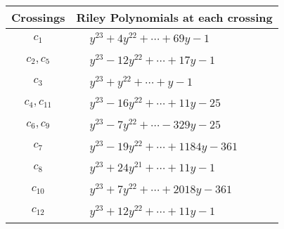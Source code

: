 \documentclass[1p]{elsarticle_modified}
\theoremstyle{definition}
\begin{document}
\begin{tabular}{m{50pt}|m{274pt}}
Crossings & \hspace{64pt}Riley Polynomials at each crossing \\
\hline $$\begin{aligned}c_{1}\end{aligned}$$&$\begin{aligned}
&y^{23}+4 y^{22}+\cdots+69 y-1
\end{aligned}$\\
\hline $$\begin{aligned}c_{2},c_{5}\end{aligned}$$&$\begin{aligned}
&y^{23}-12 y^{22}+\cdots+17 y-1
\end{aligned}$\\
\hline $$\begin{aligned}c_{3}\end{aligned}$$&$\begin{aligned}
&y^{23}+y^{22}+\cdots+y-1
\end{aligned}$\\
\hline $$\begin{aligned}c_{4},c_{11}\end{aligned}$$&$\begin{aligned}
&y^{23}-16 y^{22}+\cdots+11 y-25
\end{aligned}$\\
\hline $$\begin{aligned}c_{6},c_{9}\end{aligned}$$&$\begin{aligned}
&y^{23}-7 y^{22}+\cdots-329 y-25
\end{aligned}$\\
\hline $$\begin{aligned}c_{7}\end{aligned}$$&$\begin{aligned}
&y^{23}-19 y^{22}+\cdots+1184 y-361
\end{aligned}$\\
\hline $$\begin{aligned}c_{8}\end{aligned}$$&$\begin{aligned}
&y^{23}+24 y^{21}+\cdots+11 y-1
\end{aligned}$\\
\hline $$\begin{aligned}c_{10}\end{aligned}$$&$\begin{aligned}
&y^{23}+7 y^{22}+\cdots+2018 y-361
\end{aligned}$\\
\hline $$\begin{aligned}c_{12}\end{aligned}$$&$\begin{aligned}
&y^{23}+12 y^{22}+\cdots+11 y-1
\end{aligned}$\\
\hline
\end{tabular}\\~\\
\end{document}
